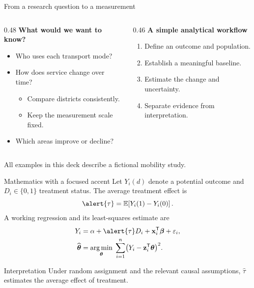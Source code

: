 \documentclass[10pt,aspectratio=169]{beamer}
\begin{document}
\begin{frame}{From a research question to a measurement}
  \begin{columns}[T,onlytextwidth]
    \begin{column}{0.48\textwidth}
      \textbf{What would we want to know?}
      \begin{itemize}
        \item Who uses each transport mode?
        \item How does service change over time?
          \begin{itemize}
            \item Compare districts consistently.
            \item Keep the measurement scale fixed.
          \end{itemize}
        \item Which areas improve or decline?
      \end{itemize}
    \end{column}
    \begin{column}{0.46\textwidth}
      \textbf{A simple analytical workflow}
      \begin{enumerate}
        \item Define an outcome and population.
        \item Establish a meaningful baseline.
        \item Estimate the change and uncertainty.
        \item \alert{Separate evidence from interpretation.}
      \end{enumerate}
    \end{column}
  \end{columns}
  \vspace{0.8em}
  {\small All examples in this deck describe a fictional mobility study.}
\end{frame}

\begin{frame}{Mathematics with a focused accent}
  Let $Y_i(d)$ denote a potential outcome and $D_i\in\{0,1\}$ treatment status.
  The average treatment effect is
  \[
    \alert{\tau}=\mathbb{E}\!\left[Y_i(1)-Y_i(0)\right].
  \]
  A working regression and its least-squares estimate are
  \begin{align*}
    Y_i &= \alpha + \alert{\tau}D_i + \mathbf{x}_i^{\mathsf T}\boldsymbol{\beta}
           + \varepsilon_i, \\
    \widehat{\boldsymbol{\theta}}
      &= \underset{\boldsymbol{\theta}}{\operatorname{arg\,min}}\;
         \sum_{i=1}^{n}\bigl(Y_i-\mathbf{z}_i^{\mathsf T}\boldsymbol{\theta}\bigr)^2.
  \end{align*}
  \begin{exampleblock}{Interpretation}
    Under random assignment and the relevant causal assumptions,
    $\widehat{\tau}$ estimates the average effect of treatment.
  \end{exampleblock}
\end{frame}
\end{document}
